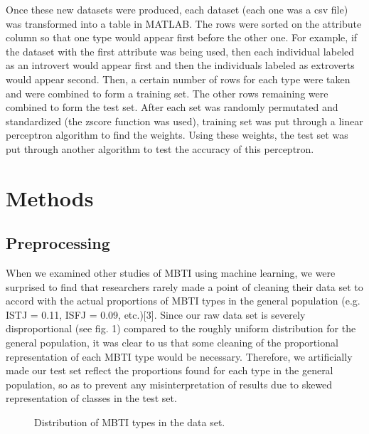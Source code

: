 \documentclass{article}
\begin{document}
Once these new datasets were produced, each dataset (each one was a csv file) was transformed into a table in MATLAB. The rows were sorted on the attribute column so that one type would appear first before the other one. For example, if the dataset with the first attribute was being used, then each individual labeled as an introvert would appear first and then the individuals labeled as extroverts would appear second. Then, a certain number of rows for each type were taken and were combined to form a training set. The other rows remaining were combined to form the test set. After each set was randomly permutated and standardized (the zscore function was used), training set was put through a linear perceptron algorithm to find the weights. Using these weights, the test set was put through another algorithm to test the accuracy of this perceptron. 
\section{Methods}
\subsection{Preprocessing}
When we examined other studies of MBTI using machine learning, we were surprised to find that researchers rarely made a point of cleaning their data set to accord with the actual proportions of MBTI types in the general population (e.g. ISTJ = 0.11, ISFJ = 0.09, etc.)[3]. Since our raw data set is severely disproportional (see fig. 1) compared to the roughly uniform distribution for the general population, it was clear to us that some cleaning of the proportional representation of each MBTI type would be necessary. Therefore, we artificially made our test set reflect the proportions found for each type in the general population, so as to prevent any misinterpretation of results due to skewed representation of classes in the test set.
\begin{figure}
  \centering
  \caption{ Distribution of MBTI types in the data set.}
\end{figure}
\end{document}
